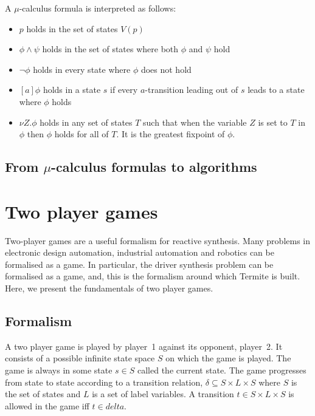 A $\mu$-calculus formula is interpreted as follows:
\begin{itemize}
    \item $p$ holds in the set of states $V(p)$
    \item $\phi \wedge \psi$ holds in the set of states where both $\phi$ and $\psi$ hold
    \item $\neg \phi$ holds in every state where $\phi$ does not hold 
    \item $[a]\phi$ holds in a state $s$ if every $a$-transition leading out of $s$ leads to a state where $\phi$ holds
    \item $\nu Z. \phi$ holds in any set of states $T$ such that when the variable $Z$ is set to $T$ in $\phi$ then $\phi$ holds for all of $T$. It is the greatest fixpoint of $\phi$.
\end{itemize}

\subsection{From $\mu$-calculus formulas to algorithms}

\section{Two player games}

Two-player games are a useful formalism for reactive synthesis. Many problems in electronic design automation, industrial automation and robotics can be formalised as a game. In particular, the driver synthesis problem can be formalised as a game, and, this is the formalism around which Termite is built. Here, we present the fundamentals of two player games. 

\subsection{Formalism}

A two player game is played by player~1 against its opponent, player~2. It consists of a possible infinite state space $S$ on which the game is played. The game is always in some state $s \in S$ called the current state. The game progresses from state to state according to a transition relation, $\delta \subseteq S \times L \times S$ where $S$ is the set of states and $L$ is a set of label variables. A transition $t \in S \times L \times S$ is allowed in the game iff $t \in delta$. 


